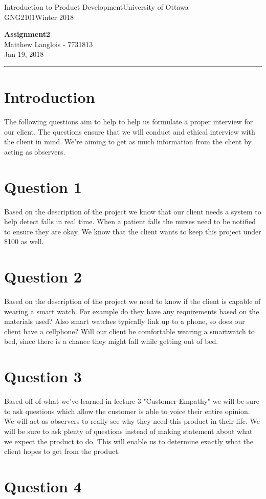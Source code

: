 \documentclass[fleqn, 12pt]{article}
\newcommand{\university}{University of Ottawa}
\newcommand{\name}{Matthew Langlois}
\newcommand{\studentNumber}{7731813}
\newcommand{\semester}{Winter 2018}
\newcommand{\assignmentType}{Assignment}
\newcommand{\assignmentNumber}{2}
\newcommand{\dueDate}{Jan 19, 2018}
\newcommand{\courseCode}{GNG2101}
\newcommand{\courseTitle}{Introduction to Product Development}
\newcommand{\essayTitle}{<Title>} %
\newcommand{\essaySubtitle}{<subtitle>} %
\newcommand{\essayAbstract}{} %
\newcommand{\beginassignemnt}{
    \newlength\tindent
    \setlength{\tindent}{\parindent}
    \setlength{\parindent}{0pt}

    \thispagestyle{assignment}
    \noindent
    \courseTitle \hfill \university\\
    \courseCode \hfill \semester
    \begin{center}
        \textbf{\assignmentType\text{ }\ifdefempty{\assignmentNumber}{}{\#}\assignmentNumber}\\
        \name \hspace{1pt} - \studentNumber\\
        \dueDate\\
    \end{center}
    \vspace{6pt}
    \hrule
    \vspace{1.5\headsep}
}
\newcommand{\beginessay}{
    \nocite{*}

    \pagestyle{frontmatter}
    \pagenumbering{roman}

    \begin{center}
        \normalsize
        \textsc{\university}\\[5cm]
        \LARGE \textbf{\MakeUppercase{\essayTitle}}\\[0.5cm]
        \large \text{ }\essaySubtitle\text{ }\\[10cm] %
        \normalsize
        \textsc{\name}\\
        \textsc{\studentNumber}\\
        \textsc{\courseCode}\\
        \textsc{\semester}\\
        \textsc{\dueDate}
    \end{center}
    \thispagestyle{empty}

    \newpage
    \tableofcontents
    \newpage

    \iftotalfigures
        \addcontentsline{toc}{section}{\listfigurename}
        \listoffigures
    \fi
    \iftotaltables
        \addcontentsline{toc}{section}{\listtablename}
        \listoftables
    \fi

    \ifdefempty{\essayAbstract}{}{
        \newpage
        \addcontentsline{toc}{section}{Abstract}
        \begin{abstract}
            \essayAbstract
        \end{abstract}

    }
    \label{EndFrontMatter}
    \newpage

    \pagenumbering{arabic}
    \pagestyle{body}
}
\begin{document}
\beginassignemnt

\section*{Introduction}

The following questions aim to help to help us formulate a proper interview for our client. The questions ensure that we will conduct and ethical interview with the client in mind. We're aiming to get as much information from the client by acting as observers.

\section*{Question 1}

Based on the description of the project we know that our client needs a system to help detect falls in real time. When a patient falls the nurses need to be notified to ensure they are okay. We know that the client wants to keep this project under \$100 as well.

\section*{Question 2}

Based on the description of the project we need to know if the client is capable of wearing a smart watch. For example do they have any requirements based on the materials used? Also smart watches typically link up to a phone, so does our client have a cellphone? Will our client be comfortable wearing a smartwatch to bed, since there is a chance they might fall while getting out of bed.

\section*{Question 3}

Based off of what we've learned in lecture 3 "Customer Empathy" we will be sure to ask questions which allow the customer is able to voice their entire opinion. We will act as observers to really see why they need this product in their life. We will be sure to ask plenty of questions instead of making statement about what we expect the product to do. This will enable us to determine exactly what the client hopes to get from the product.

\section*{Question 4}
\end{document}

